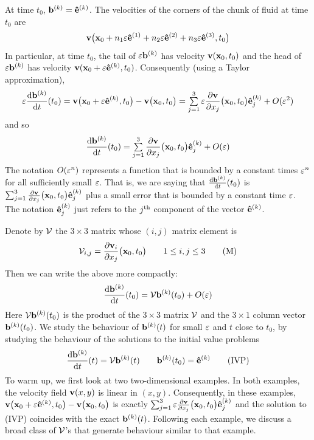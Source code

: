 At time $t_0$, $\mathbf{b}^{(k)}=\mathbf{\hat e}^{(k)}$.
The velocities  of the corners of the chunk of fluid at time $t_0$ are 
\begin{equation*}
\mathbf{v}\big(\mathbf{x}_0+n_1\varepsilon\mathbf{\hat e}^{(1)}+n_2\varepsilon\mathbf{\hat e}^{(2)}+n_3\varepsilon\mathbf{\hat e}^{(3)},t_0\big)
\end{equation*}
In particular, at time $t_0$, the tail of $\varepsilon\mathbf{b}^{(k)}$ has velocity 
$\mathbf{v}(\mathbf{x}_0,t_0)$ and the head of $\varepsilon\mathbf{b}^{(k)}$ has velocity 
$\mathbf{v}(\mathbf{x}_0+\varepsilon\mathbf{\hat e}^{(k)},t_0)$. Consequently (using a Taylor approximation), 
\begin{equation*}
\veps\diff{\vb^{(k)}}{t}(t_0)=\vv\big(\vx_0+\veps\ha{k},t_0\big)
      -\vv\big(\vx_0,t_0\big)
=\smsum_{j=1}^3\veps\frac{\partial\vv}{\partial x_j}\big(\vx_0,t_0\big)\ha{k}_j
+O(\veps^2)
\end{equation*}
and so
\begin{equation*}
\diff{\vb^{(k)}}{t}(t_0)
=\smsum_{j=1}^3\frac{\partial\vv}{\partial x_j}\big(\vx_0,t_0\big)\ha{k}_j
+O(\veps)
\end{equation*}
The notation $O(\varepsilon^n)$ represents a function that is bounded by a constant
times $\varepsilon^n$ for all sufficiently small $\varepsilon$. That is, we are saying that
$\diff{\vb^{(k)}}{t}(t_0)$ is 
$\mathop{{\textstyle \sum}}_{j=1}^3\frac{\partial\mathbf{v}}{\partial x_j}\big(\mathbf{x}_0,t_0\big)\mathbf{\hat e}^{(k)}_j$
plus a small error that is bounded by a constant time $\varepsilon$.
The notation $\mathbf{\hat e}^{(k)}_j$
just refers to the $j^{\rm th}$ component of the vector $\mathbf{\hat e}^{(k)}$.

Denote by $\mathcal{V}$ the $3\times 3$ matrix whose $(i,j)$ matrix element is
\begin{equation}
\mathcal{V}_{i,j}=\frac{\partial \mathbf{v}_i}{\partial x_j}\big(\mathbf{x}_0,t_0\big)
\qquad 1\le i,j\le 3
\tag{M}\end{equation}
Then we can write the above more compactly:
\begin{equation*}
\diff{\vb^{(k)}}{t}(t_0)=\cV\vb^{(k)}(t_0)+O(\veps)
\end{equation*}
Here $\mathcal{V}\mathbf{b}^{(k)}(t_0)$ is the product of the $3\times 3$ matrix $\mathcal{V}$ and the $3\times 1$ column vector $\mathbf{b}^{(k)}(t_0)$. 
We study the behaviour of $\mathbf{b}^{(k)}(t)$ for small $\varepsilon$  and $t$ close to
$t_0$, by studying the behaviour of the solutions to the initial value problems
\begin{equation}
\diff{\vb^{(k)}}{t}(t)=\cV\vb^{(k)}(t)\qquad \vb^{(k)}(t_0)=\ha{k}
\tag{IVP}\end{equation}
To warm up, we first look at two two-dimensional examples. In both 
examples, the velocity field $\mathbf{v}(x,y)$ is linear in $(x,y)$. 
Consequently, in these examples, $\mathbf{v}\big(\mathbf{x}_0+\varepsilon\mathbf{\hat e}^{(k)},t_0\big)-\mathbf{v}\big(\mathbf{x}_0,t_0\big)$
is exactly $\mathop{{\textstyle \sum}}_{j=1}^3\varepsilon\frac{\partial\mathbf{v}}
{\partial x_j}\big(\mathbf{x}_0,t_0\big)\mathbf{\hat e}^{(k)}_j$ and 
 the solution to (IVP) coincides with the exact $\mathbf{b}^{(k)}(t)$.
Following each example, we discuss a broad class of $\mathcal{V}$'s that generate  
behaviour similar to that example. 

